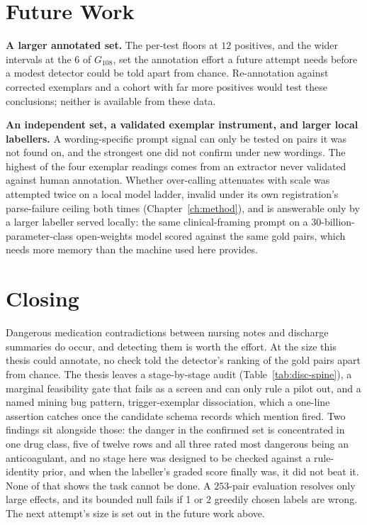 \section{Future Work}
\label{sec:conc-future}

\textbf{A larger annotated set.} The per-test floors at $12$ positives, and the wider intervals at the $6$ of $G_{108}$, set
the annotation effort a future attempt needs before a modest detector could be told apart
from chance. Re-annotation against corrected exemplars and a cohort with far more positives would test
these conclusions; neither is available from these data.

\textbf{An independent set, a validated exemplar instrument, and larger local
labellers.} A wording-specific prompt signal can only be tested on pairs it was
not found on, and the strongest one did not confirm under new wordings. The
highest of the four exemplar readings comes from an extractor never validated
against human annotation. Whether over-calling attenuates
with scale was attempted twice on a local model ladder, invalid under its own registration's
parse-failure ceiling both
times (Chapter~\ref{ch:method}), and is answerable only by a larger labeller served
locally: the same clinical-framing prompt on a 30-billion-parameter-class
open-weights model scored against the same gold pairs, which needs more memory
than the machine used here provides.

\section{Closing}
\label{sec:conc-closing}

Dangerous medication contradictions between nursing notes and discharge
summaries do occur, and detecting them is worth the effort. At the size this thesis could
annotate, no check told the detector's ranking of the gold pairs apart from chance. The thesis leaves a
stage-by-stage audit (Table~\ref{tab:disc-spine}), a marginal feasibility gate that fails as
a screen and can only rule a pilot out, and a named mining bug pattern, trigger-exemplar dissociation,
which a one-line assertion catches once the candidate schema records which mention
fired. Two findings sit alongside those: the danger in the confirmed set is concentrated in one drug
class, five of twelve rows and all three rated most dangerous being an anticoagulant, and no stage here was designed to be
checked against a rule-identity prior, and when the labeller's graded score finally was, it did not
beat it. None of that shows the task cannot be done. A $253$-pair evaluation resolves only large effects, and its bounded null fails if 1 or 2
greedily chosen labels are wrong. The next attempt's size is set out in the future work
above.
